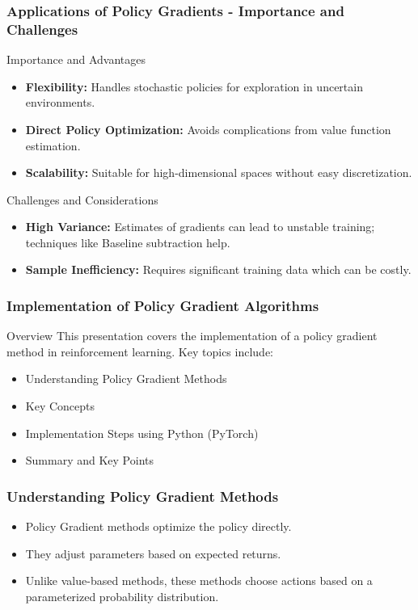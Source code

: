 \documentclass[aspectratio=169]{beamer}
\begin{document}
\begin{frame}[fragile]
    \frametitle{Applications of Policy Gradients - Importance and Challenges}
    \begin{block}{Importance and Advantages}
        \begin{itemize}
            \item \textbf{Flexibility:} Handles stochastic policies for exploration in uncertain environments.
            \item \textbf{Direct Policy Optimization:} Avoids complications from value function estimation.
            \item \textbf{Scalability:} Suitable for high-dimensional spaces without easy discretization.
        \end{itemize}
    \end{block}

    \begin{block}{Challenges and Considerations}
        \begin{itemize}
            \item \textbf{High Variance:} Estimates of gradients can lead to unstable training; techniques like Baseline subtraction help.
            \item \textbf{Sample Inefficiency:} Requires significant training data which can be costly.
        \end{itemize}
    \end{block}
\end{frame}

\begin{frame}
    \frametitle{Implementation of Policy Gradient Algorithms}
    \begin{block}{Overview}
        This presentation covers the implementation of a policy gradient method in reinforcement learning. 
        Key topics include:
        \begin{itemize}
            \item Understanding Policy Gradient Methods
            \item Key Concepts
            \item Implementation Steps using Python (PyTorch)
            \item Summary and Key Points
        \end{itemize}
    \end{block}
\end{frame}

\begin{frame}
    \frametitle{Understanding Policy Gradient Methods}
    \begin{itemize}
        \item Policy Gradient methods optimize the policy directly.
        \item They adjust parameters based on expected returns.
        \item Unlike value-based methods, these methods choose actions based on a parameterized probability distribution.
    \end{itemize}
\end{frame}
\end{document}
